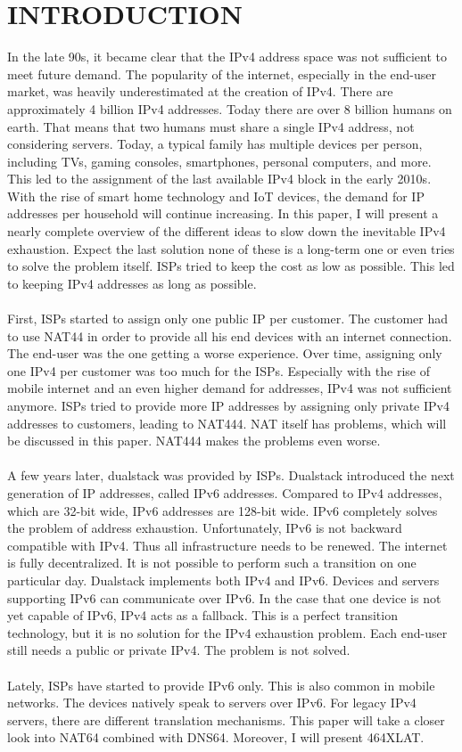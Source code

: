 \documentclass[format=sigconf, natbib=true, nonacm=true]{acmart}
\begin{document}
    \section{INTRODUCTION}
    In the late 90s, it became clear that the IPv4 address space was not sufficient to meet future demand. The popularity of the internet, especially in the end-user market, was heavily underestimated at the creation of IPv4. There are approximately 4 billion IPv4 addresses. Today there are over 8 billion humans on earth. That means that two humans must share a single IPv4 address, not considering servers. Today, a typical family has multiple devices per person, including TVs, gaming consoles, smartphones, personal computers, and more. This led to the assignment of the last available IPv4 block in the early 2010s. With the rise of smart home technology and IoT devices, the demand for IP addresses per household will continue increasing. In this paper, I will present a nearly complete overview of the different ideas to slow down the inevitable IPv4 exhaustion. Expect the last solution none of these is a long-term one or even tries to solve the problem itself. ISPs tried to keep the cost as low as possible. This led to keeping IPv4 addresses as long as possible.\\\\First, ISPs started to assign only one public IP per customer. The customer had to use NAT44 in order to provide all his end devices with an internet connection. The end-user was the one getting a worse experience. Over time, assigning only one IPv4 per customer was too much for the ISPs. Especially with the rise of mobile internet and an even higher demand for addresses, IPv4 was not sufficient anymore. ISPs tried to provide more IP addresses by assigning only private IPv4 addresses to customers, leading to NAT444. NAT itself has problems, which will be discussed in this paper. NAT444 makes the problems even worse.\\\\A few years later, dualstack was provided by ISPs. Dualstack introduced the next generation of IP addresses, called IPv6 addresses. Compared to IPv4 addresses, which are 32-bit wide, IPv6 addresses are 128-bit wide. IPv6 completely solves the problem of address exhaustion. Unfortunately, IPv6 is not backward compatible with IPv4. Thus all infrastructure needs to be renewed. The internet is fully decentralized. It is not possible to perform such a transition on one particular day. Dualstack implements both IPv4 and IPv6. Devices and servers supporting IPv6 can communicate over IPv6. In the case that one device is not yet capable of IPv6, IPv4 acts as a fallback. This is a perfect transition technology, but it is no solution for the IPv4 exhaustion problem. Each end-user still needs a public or private IPv4. The problem is not solved.\\\\Lately, ISPs have started to provide IPv6 only. This is also common in mobile networks. The devices natively speak to servers over IPv6. For legacy IPv4 servers, there are different translation mechanisms. This paper will take a closer look into NAT64 combined with DNS64. Moreover, I will present 464XLAT. 
\end{document}
